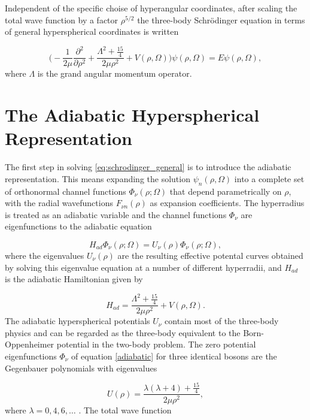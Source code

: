 Independent of the specific choise of hyperangular coordinates, after scaling the total wave function by a factor $\rho^{5/2}$ the three-body Schr{\"o}dinger equation in terms of general hyperspherical coordinates is written

\begin{equation}\label{eq:schrodinger_general}
\bigg(-\frac{1}{2 \mu}\frac{\partial^2}{\partial \rho^2} + \frac{ \Lambda^2 + \frac{15}{4}}{2 \mu \rho^{2}}+ V(\rho,\Omega)\bigg)\psi(\rho,\Omega) = E\psi(\rho,\Omega),
\end{equation}
where $\Lambda$ is the grand angular momentum operator.

\section{The Adiabatic Hyperspherical Representation}\label{sec:AHM}
The first step in solving \eqref{eq:schrodinger_general} is to introduce the adiabatic representation. This means expanding the solution $\psi_{n}(\rho,\Omega)$ into a complete set of orthonormal channel functions $\Phi_{\nu}(\rho;\Omega)$ that depend parametrically on $\rho$, with the radial wavefunctions $F_{\nu n}(\rho)$ as expansion coefficients. The hyperradius is treated as an adiabatic variable and the channel functions $\Phi_{\nu}$ are eigenfunctions to the adiabatic equation

\begin{equation}\label{adiabatic}
H_{ad}\Phi_{\nu}{(\rho;\Omega)} = U_{\nu}{(\rho)}\Phi_{\nu}(\rho;\Omega), 
\end{equation}
where the eigenvalues $U_{\nu}(\rho)$ are the resulting effective potental curves obtained by solving this eigenvalue equation at a number of different hyperradii, and $H_{ad}$ is the adiabatic Hamiltonian given by

\begin{equation}\label{eq:adiabitic_hamiltonian}
H_{ad} = \frac{\Lambda^2+\frac{15}{4}}{2 \mu \rho^2} + V(\rho,\Omega).
\end{equation}
The adiabatic hyperspherical potentials $U_{\nu}$ contain most of the three-body physics and can be regarded as the three-body equivalent to the Born-Oppenheimer potential in the two-body problem. The zero potential eigenfunctions $\Phi_{\nu}$ of equation \eqref{adiabatic} for three identical bosons are the Gegenbauer polynomials with eigenvalues

\begin{equation}\label{eq:gegenbauer}
U(\rho) = \frac{\lambda(\lambda + 4) + \frac{15}{4}}{2\mu \rho^2},
\end{equation} 
where $\lambda = 0, 4, 6, \ldots$ \cite{Blume2002}.
The total wave function


